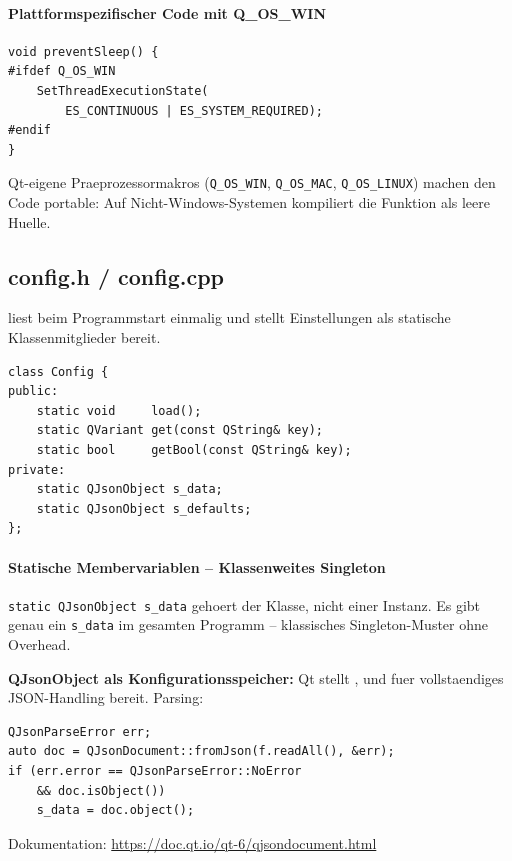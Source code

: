 \paragraph{Plattformspezifischer Code mit Q\_OS\_WIN}
\begin{lstlisting}
void preventSleep() {
#ifdef Q_OS_WIN
    SetThreadExecutionState(
        ES_CONTINUOUS | ES_SYSTEM_REQUIRED);
#endif
}
\end{lstlisting}
Qt-eigene Praeprozessormakros (\verb|Q_OS_WIN|,
\verb|Q_OS_MAC|, \verb|Q_OS_LINUX|) machen den Code
portable: Auf Nicht-Windows-Systemen kompiliert die
Funktion als leere Huelle.

\subsection{config.h / config.cpp}

 liest beim Programmstart einmalig
 und stellt Einstellungen
als statische Klassenmitglieder bereit.

\begin{lstlisting}[style=header, caption={config.h}]
class Config {
public:
    static void     load();
    static QVariant get(const QString& key);
    static bool     getBool(const QString& key);
private:
    static QJsonObject s_data;
    static QJsonObject s_defaults;
};
\end{lstlisting}

\paragraph{Statische Membervariablen -- Klassenweites Singleton}
\verb|static QJsonObject s_data| gehoert der Klasse,
nicht einer Instanz. Es gibt genau ein \verb|s_data|
im gesamten Programm -- klassisches Singleton-Muster
ohne Overhead.

\begin{qtinfo}
\textbf{QJsonObject als Konfigurationsspeicher:}
Qt stellt ,  und
 fuer vollstaendiges JSON-Handling
bereit. Parsing:
\begin{lstlisting}
QJsonParseError err;
auto doc = QJsonDocument::fromJson(f.readAll(), &err);
if (err.error == QJsonParseError::NoError
    && doc.isObject())
    s_data = doc.object();
\end{lstlisting}
Dokumentation: \url{https://doc.qt.io/qt-6/qjsondocument.html}
\end{qtinfo}
